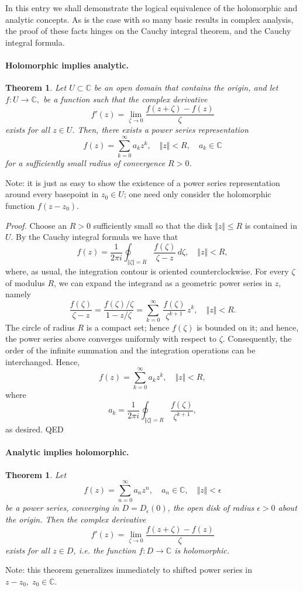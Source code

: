 \documentclass[12pt]{article}
\newcommand{\cnums}{\mathbb{C}}
\newtheorem{theorem}[proposition]{Theorem}
\begin{document}
In this entry we shall demonstrate the logical equivalence of the holomorphic
and analytic concepts.   As is the case with so many basic results in
complex analysis, the proof of these facts hinges on the Cauchy
integral theorem, and the Cauchy integral formula.

\paragraph{Holomorphic implies analytic.}
\begin{theorem}
Let $U\subset\cnums$ be an open domain that contains the origin, and
let $f:U\rightarrow\cnums,$
be a function such that
the complex derivative
$$f'(z) = \lim_{\zeta\rightarrow 0} \frac{f(z+\zeta)-f(z)}{\zeta}$$
exists for all $z\in U$.  Then,  there exists a power series representation
$$f(z) = \sum_{k=0}^\infty a_k z^k,\quad \Vert z\Vert < R,\quad
a_k\in\cnums$$ 
for a
sufficiently small radius of convergence $R>0$.  
\end{theorem}
Note: it is just as
easy to show the existence of a power series representation around
every basepoint in $z_0\in U$; one need only consider the holomorphic
function $f(z-z_0)$.

\emph{Proof.}  Choose an $R>0$ sufficiently small so that the 
disk $\Vert z\Vert \leq R$ is contained in $U$.
By the Cauchy integral formula we have
that
$$f(z) = \frac{1}{2\pi i} \oint_{\Vert \zeta \Vert = R} \frac{f(\zeta)}{\zeta-z}\,
d\zeta,\quad \Vert z\Vert < R,$$
where, as usual, the integration contour is oriented
counterclockwise.  For every $\zeta$  of modulus $R$, we can expand
the integrand as a geometric power series in $z$, namely
$$\frac{f(\zeta)}{\zeta-z} = \frac{f(\zeta)/\zeta}{1-z/\zeta} =
\sum_{k=0}^\infty\, \frac{f(\zeta)}{\zeta^{k+1}}\, z^k,\quad \Vert
z\Vert < R.$$
The circle of radius $R$ is a compact set; hence
$f(\zeta)$ is bounded on it; and hence, the power series above
converges uniformly with respect to $\zeta$.  Consequently, the order
of the infinite summation and the integration operations can be
interchanged. Hence,
$$f(z) = \sum_{k=0}^\infty a_k z^k,\quad \Vert z\Vert< R,$$
where
$$a_k = \frac{1}{2\pi i} \oint_{\Vert \zeta \Vert = R}
\frac{f(\zeta)}{\zeta^{k+1}},$$
as desired.  QED

\paragraph{Analytic implies holomorphic.}
\begin{theorem}
Let 
$$f(z) = \sum_{n=0}^\infty a_n z^n,\quad a_n\in\cnums,\quad \Vert
z\Vert<\epsilon$$ 
be a power series, converging in $D=D_\epsilon(0)$, the open disk of radius
$\epsilon>0$ about the origin.  Then the complex derivative
$$f'(z) =\lim_{\zeta\rightarrow 0} \frac{f(z+\zeta)-f(z)}{\zeta}$$
exists for all $z\in D$, i.e. the function $f:D\rightarrow
\cnums$ is holomorphic.
\end{theorem}
Note: this theorem generalizes immediately to shifted power series in
$z-z_0,\; z_0\in\cnums$.
\end{document}
